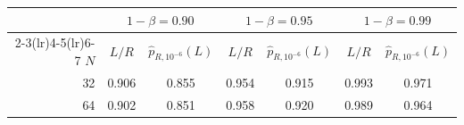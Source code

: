   \begin{tabular}{rcccccc}
    \toprule
     & \multicolumn{2}{c}{$1-\beta = 0.90$} & \multicolumn{2}{c}{$1-\beta = 0.95$} & \multicolumn{2}{c}{$1-\beta = 0.99$} \\
    \cmidrule(lr){2-3}\cmidrule(lr){4-5}\cmidrule(lr){6-7}
    $N$ & $L/R$ & $\widehat p_{R,10^{-6}}(L)$ & $L/R$ & $\widehat p_{R,10^{-6}}(L)$ & $L/R$ & $\widehat p_{R,10^{-6}}(L)$ \\
    \midrule
    32 & 0.906 & 0.855 & 0.954 & 0.915 & 0.993 & 0.971 \\
    64 & 0.902 & 0.851 & 0.958 & 0.920 & 0.989 & 0.964 \\
    \bottomrule
  \end{tabular}%
